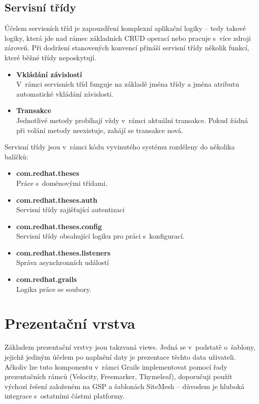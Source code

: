 \subsection{Servisní třídy}
Účelem servisních tříd je zapouzdření komplexní aplikační logiky -- tedy takové logiky, která jde nad rámec základních CRUD operací nebo pracuje s~více zdroji zároveň. Při dodržení stanovených konvencí přináší servisní třídy několik funkcí, které běžné třídy neposkytují.

\begin{itemize}
\item \textbf{Vkládání závislostí}\\
V~rámci servisních tříd funguje na základě jména třídy a jména atributu automatické vkládání závislosti.
\item \textbf{Transakce}\\
Jednotlivé metody probíhají vždy v~rámci aktuální transakce. Pokud žádná při volání metody neexistuje, zahájí se transakce nová.
\end{itemize}

Servisní třídy jsou v~rámci kódu vyvinutého systému rozděleny do několika balíčků:
\begin{itemize}
\item \textbf{com.redhat.theses} \\
Práce s~doménovými třídami.
\item \textbf{com.redhat.theses.auth} \\
Servisní třídy zajišťující autentizaci
\item \textbf{com.redhat.theses.config} \\
Servisní třídy obsahující logiku pro práci s~konfigurací.
\item \textbf{com.redhat.theses.listeners} \\
Správa asynchronních událostí
\item \textbf{com.redhat.grails} \\
Logika práce se soubory.
\end{itemize}

\section{Prezentační vrstva}
Základem prezentační vrstvy jsou takzvaná views. Jedná se v~podstatě o~šablony, jejichž jediným účelem po naplnění daty je prezentace těchto data uživateli. Ačkoliv lze tuto komponentu v~rámci Grails implementovat pomocí řady prezentačních rámců (Velocity, Freemarker,  Thymeleaf), doporučuji použít výchozí řešení založeném na GSP a šablonách SiteMesh -- důvodem je hluboká integrace s~ostatními částmi platformy.

